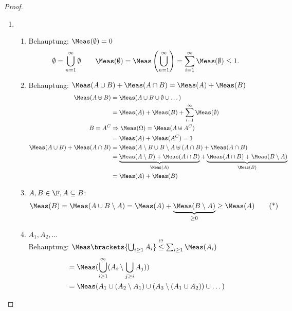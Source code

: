 \begin{proof}
	\begin{enumerate}
		\item 
		\begin{enumerate}
			\item Behauptung: $\Meas(\emptyset) = 0$
			\begin{align*}
			\emptyset = \bigcup_{n=1}^{\infty} \emptyset\qquad 
			\Meas(\emptyset) = \Meas\left(\bigcup_{n=1}^{\infty}\right) = \sum_{i= 1}^{\infty} \Meas(\emptyset) \le 1.
			\end{align*}
			\item Behauptung: $\Meas(A \cup B) + \Meas(A \cap B) = \Meas(A) + \Meas(B)$
			\begin{align}
				\Meas(A\uplus B) 
				&= \Meas(A \cup B \cup \emptyset \cup \dots)\notag\\ 
				&= \Meas(A) + \Meas(B) + \sum_{i=1}^{\infty}\Meas(\emptyset)\notag\\
				B = A^C &\Rightarrow \Meas(\Omega) = \Meas(A \uplus A^C)\notag\\
				&= \Meas(A) + \Meas(A^C) = 1\notag\\
				\Meas(A \cup B) + \Meas(A \cap B) 
				&= \Meas(A \setminus B \cup B\setminus A \uplus (A \cap B) + \Meas(A \cap B)\notag\\
				&= \underbrace{\Meas(A\setminus B)  + \Meas(A \cap B)}_{\Meas(A)} + \underbrace{\Meas(A \cap B) + \Meas(B\setminus A)}_{\Meas(B)}\notag\\
				&= \Meas(A) + \Meas(B)\notag
			\end{align}
			\item $A,B \in \F, A \subseteq B$:\\
			\begin{align}
				\Meas(B) = \Meas(A \cup B\setminus A) = \Meas(A) + \underbrace{\Meas(B\setminus A)}_{\ge 0} \ge \Meas(A) 
				\label{eq_1}\tag{*}
			\end{align}
			\item $A_1,A_2,\dots$\\
			Behauptung: $\Meas\brackets{\bigcup_{i \ge 1} A_i} \overset{!?}{\le} \sum_{i\ge 1} \Meas(A_i)$
			\begin{align}
			&= \Meas(\bigcup_{i \ge 1}^{\infty}(A_i \setminus \bigcup_{j \ge i} A_j))\notag\\ 
			&= \Meas(A_1 \cup (A_2 \setminus A_1) \cup (A_3 \setminus (A_1 \cup A_2)) \cup \dots)\notag\\

\end{align}
\end{enumerate}
\end{enumerate}
\end{proof}
